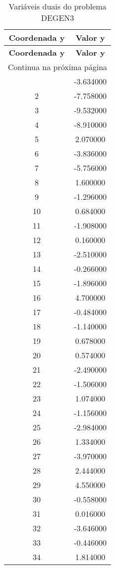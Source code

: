 \documentclass[12pt]{article}
\begin{document}
\begin{longtable}{@{}cc@{}}
\caption{Variáveis duais do problema DEGEN3} \\
\toprule
\textbf{Coordenada y} & \textbf{Valor y} \\
\midrule
\endfirsthead

\toprule
\textbf{Coordenada y} & \textbf{Valor y} \\
\midrule
\endhead

\midrule \multicolumn{2}{r}{{Continua na próxima página}} \\ \midrule
\endfoot

\bottomrule
\endlastfoot
1 & -3.634000 \\
2 & -7.758000 \\
3 & -9.532000 \\
4 & -8.910000 \\
5 & 2.070000 \\
6 & -3.836000 \\
7 & -5.756000 \\
8 & 1.600000 \\
9 & -1.296000 \\
10 & 0.684000 \\
11 & -1.908000 \\
12 & 0.160000 \\
13 & -2.510000 \\
14 & -0.266000 \\
15 & -1.896000 \\
16 & 4.700000 \\
17 & -0.484000 \\
18 & -1.140000 \\
19 & 0.678000 \\
20 & 0.574000 \\
21 & -2.490000 \\
22 & -1.506000 \\
23 & 1.074000 \\
24 & -1.156000 \\
25 & -2.984000 \\
26 & 1.334000 \\
27 & -3.970000 \\
28 & 2.444000 \\
29 & 4.550000 \\
30 & -0.558000 \\
31 & 0.016000 \\
32 & -3.646000 \\
33 & -0.446000 \\
34 & 1.814000 \\

\end{longtable}
\end{document}
